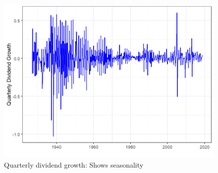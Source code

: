 \documentclass[11pt,letter]{article}
\begin{document}
\begin{figure}[!htb]
	\centering
	\includegraphics[scale = 0.4]{quarterly_div_growth.png}
	\caption{Quarterly dividend growth: Shows seasonality }
	\label{fig:quarterly_div_growth}
\end{figure}
\end{document}
